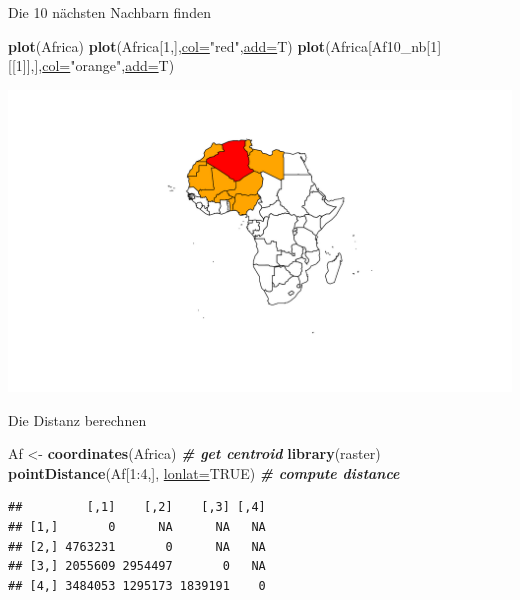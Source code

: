 \documentclass[ignorenonframetext,]{beamer}
\newenvironment{Shaded}{\begin{snugshade}}{\end{snugshade}}
\newcommand{\CommentTok}[1]{\textcolor[rgb]{0.00,0.40,1.00}{\textbf{\textit{#1}}}}
\newcommand{\DataTypeTok}[1]{\textcolor[rgb]{0.74,0.68,0.62}{\underline{#1}}}
\newcommand{\DecValTok}[1]{\textcolor[rgb]{0.27,0.67,0.26}{#1}}
\newcommand{\KeywordTok}[1]{\textcolor[rgb]{0.26,0.66,0.93}{\textbf{#1}}}
\newcommand{\NormalTok}[1]{\textcolor[rgb]{0.74,0.68,0.62}{#1}}
\newcommand{\OperatorTok}[1]{\textcolor[rgb]{0.74,0.68,0.62}{#1}}
\newcommand{\OtherTok}[1]{\textcolor[rgb]{0.74,0.68,0.62}{#1}}
\newcommand{\StringTok}[1]{\textcolor[rgb]{0.02,0.61,0.04}{#1}}
\begin{document}
\begin{frame}[fragile]{Die 10 nächsten Nachbarn finden}
\protect\hypertarget{die-10-nachsten-nachbarn-finden}{}

\begin{Shaded}
\begin{Highlighting}[]
\KeywordTok{plot}\NormalTok{(Africa)}
\KeywordTok{plot}\NormalTok{(Africa[}\DecValTok{1}\NormalTok{,],}\DataTypeTok{col=}\StringTok{"red"}\NormalTok{,}\DataTypeTok{add=}\NormalTok{T)}
\KeywordTok{plot}\NormalTok{(Africa[Af10_nb[}\DecValTok{1}\NormalTok{][[}\DecValTok{1}\NormalTok{]],],}\DataTypeTok{col=}\StringTok{"orange"}\NormalTok{,}\DataTypeTok{add=}\NormalTok{T)}
\end{Highlighting}
\end{Shaded}

\includegraphics{A7_spdep_files/figure-beamer/unnamed-chunk-19-1.pdf}

\end{frame}

\begin{frame}[fragile]{Die Distanz berechnen}
\protect\hypertarget{die-distanz-berechnen}{}

\begin{Shaded}
\begin{Highlighting}[]
\NormalTok{Af <-}\StringTok{ }\KeywordTok{coordinates}\NormalTok{(Africa) }\CommentTok{# get centroid}
\KeywordTok{library}\NormalTok{(raster)}
\KeywordTok{pointDistance}\NormalTok{(Af[}\DecValTok{1}\OperatorTok{:}\DecValTok{4}\NormalTok{,], }\DataTypeTok{lonlat=}\OtherTok{TRUE}\NormalTok{) }\CommentTok{# compute distance}
\end{Highlighting}
\end{Shaded}

\begin{verbatim}
##         [,1]    [,2]    [,3] [,4]
## [1,]       0      NA      NA   NA
## [2,] 4763231       0      NA   NA
## [3,] 2055609 2954497       0   NA
## [4,] 3484053 1295173 1839191    0
\end{verbatim}

\end{frame}
\end{document}
